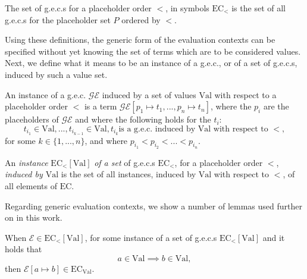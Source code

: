 \begin{definition}
The set of g.e.c.s for a placeholder order $<$, in symbols $\textrm{EC}_<$ is the set of all g.e.c.s for the placeholder set $P$ ordered by $<$.
\end{definition}

Using these definitions, the generic form of the evaluation contexts can be specified without yet knowing the set of terms which are to be considered values. Next, we define what it means to be an instance of a g.e.c., or of a set of g.e.c.s, induced by such a value set.

\begin{definition}[Instance of a g.e.c.]
An instance of a g.e.c. $\mathcal{GE}$ induced by a set of values $\textrm{Val}$ with respect to  a placeholder order $<$ is a term $\mathcal{GE}[p_1 \mapsto t_1, ..., p_n \mapsto t_n]$, where the $p_i$ are the placeholders of $\mathcal{GE}$ and where the following holds for the $t_i$:
\[
t_{i_1} \in \textrm{Val}, ..., t_{i_{k-1}} \in \textrm{Val}, t_{i_k} \textrm{is a g.e.c. induced by Val with respect to } <,
\]
for some $k \in \{1, ..., n\}$, and where $p_{i_1} < p_{i_2} < ... < p_{i_n}$.
\end{definition}

\begin{definition}
An \textit{instance} $\textrm{EC}_<[\textrm{Val}]$ \textit{of a set} of g.e.c.s $\textrm{EC}_<$, for a placeholder order $<$, \textit{induced by $\textrm{Val}$} is the set of all instances, induced by $\textrm{Val}$ with respect to $<$, of all elements of $\textrm{EC}$.
\end{definition}

Regarding generic evaluation contexts, we show a number of lemmas used further on in this work.

\begin{lemma}
When $\mathcal{E} \in \textrm{EC}_<[{\textrm{Val}}]$, for some instance of a set of g.e.c.s $\textrm{EC}_<[\textrm{Val}]$ and it holds that
\[
a \in \textrm{Val} \implies b \in \textrm{Val},
\]
then $\mathcal{E}[a \mapsto b] \in \textrm{EC}_{\textrm{Val}}$.
\end{lemma}
